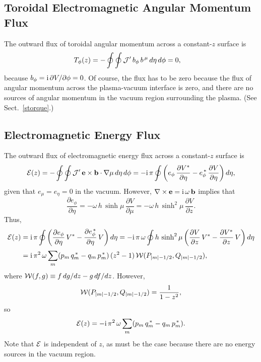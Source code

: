 \documentclass[12pt,prb,aps]{revtex4-1}
\begin{document}
\subsection{Toroidal Electromagnetic Angular Momentum Flux}
The outward flux of toroidal angular momentum across a constant-$z$ surface is\,\cite{tj,tj1}
\begin{align}
T_\phi(z) &= -\oint\oint {\cal J}' \,b_\phi\,b^{\,\mu}\,d\eta\,d\phi = 0,
\end{align}
because $b_\phi = {\rm i}\,\partial V/\partial\phi = 0$. Of course, the flux has to be zero because the flux of angular momentum across the plasma-vacuum
interface is zero, and there are no sources of angular momentum in the vacuum region surrounding the plasma. (See Sect.~\ref{storque}.)

\subsection{Electromagnetic Energy Flux}
The outward flux of electromagnetic energy flux across a constant-$z$ surface is
\begin{align}
{\cal E}(z) = -\oint\oint {\cal J}'\,{\bf e}\times {\bf b}\cdot\nabla \mu\,d\eta\,d\phi= -{\rm i}\,\pi\oint\left(e_\phi\,\frac{\partial V^\ast}{\partial\eta}
- e_\phi^{\,\ast}\,\frac{\partial V}{\partial\eta}\right)d\eta,
\end{align}
given that $e_\mu=e_\eta=0$ in the vacuum. 
However, $\nabla\times{\bf e}= {\rm i}\,\omega\,{\bf b}$ implies that
\begin{equation}
\frac{\partial e_\phi}{\partial\eta} = - \omega\,h\,\sinh\mu\,\frac{\partial V}{\partial \mu}= - \omega\,h\,\sinh^2\mu\,\frac{\partial V}{\partial z}. 
\end{equation}
Thus,
\begin{align}
{\cal E}(z) &= {\rm i}\,\pi\oint\left(\frac{\partial e_\phi}{\partial\eta}\,V^\ast - \frac{\partial e_\phi^{\,\ast}}{\partial\eta}\,V\right)d\eta= 
-{\rm i}\,\pi\,\omega\oint h\,\sinh^2\mu\left(\frac{\partial V}{\partial z}\,V^\ast - \frac{\partial V^\ast}{\partial z}\,V\right) d\eta\nonumber\\[0.5ex]
&= {\rm i}\,\pi^2\,\omega\sum_m(p_m\,q_m^{\,\ast}-q_m\,p_m^{\,\ast})\,(z^2-1)\,{\cal W}(P_{|m|-1/2},Q_{|m|-1/2}),
 \end{align}
 where ${\cal W}(f,g)\equiv f\,dg/dz-g\,df/dz$. However,\cite{mf2}
 \begin{equation}
 {\cal W}(P_{|m|-1/2},Q_{|m|-1/2}) = \frac{1}{1-z^2},
 \end{equation}
 so
 \begin{equation}\label{e168g}
 {\cal E}(z)=- {\rm i}\,\pi^2\,\omega\sum_m(p_m\,q_m^{\,\ast}-q_m\,p_m^{\,\ast}).
 \end{equation}
 Note that ${\cal E}$ is independent of $z$, as must be the case because there are no energy sources in the vacuum region. 
\end{document}
